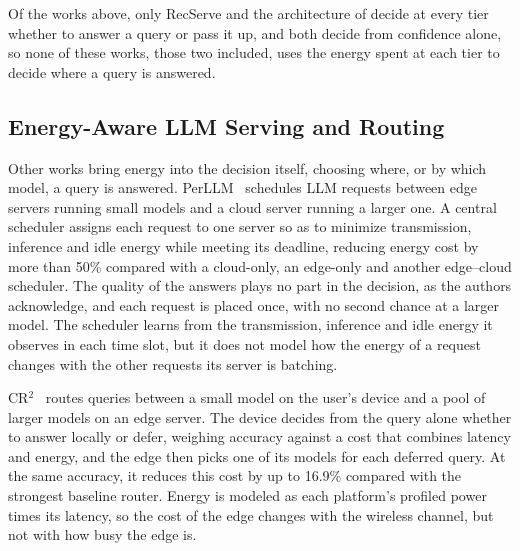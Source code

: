 \documentclass[cic,dipl,english]{infufrgs}
\begin{document}
Of the works above, only RecServe and the architecture of
 decide at every tier whether to answer a query
or pass it up, and both decide from confidence alone, so none of these works, those two
included, uses the energy spent at each tier to decide where a query is answered.

\subsection{Energy-Aware LLM Serving and Routing}
\label{sec:energy-routing}

Other works bring energy into the decision itself, choosing where, or by which model, a
query is answered. PerLLM~\cite{yang2024perllm} schedules LLM requests between edge servers running small
models and a cloud server running a larger one. A central scheduler assigns each request
to one server so as to minimize transmission, inference and idle energy while meeting
its deadline, reducing energy cost by more than 50\% compared with a cloud-only, an
edge-only and another edge--cloud scheduler. The quality of the answers plays no part in
the decision, as the authors acknowledge, and each request is placed once, with no
second chance at a larger model. The scheduler learns from the transmission, inference
and idle energy it observes in each time slot, but it does not model how the energy of a
request changes with the other requests its server is batching.

CR$^2$~\cite{xue2026cr2} routes queries between a small model on the user's device and
a pool of larger models on an edge server. The device decides from the query alone
whether to answer locally or defer, weighing accuracy against a cost that combines
latency and energy, and the edge then picks one of its models for each deferred query.
At the same accuracy, it reduces this cost by up to 16.9\% compared with the strongest
baseline router. Energy is modeled as each platform's profiled power times its latency,
so the cost of the edge changes with the wireless channel, but not with how busy the
edge is.
\end{document}
